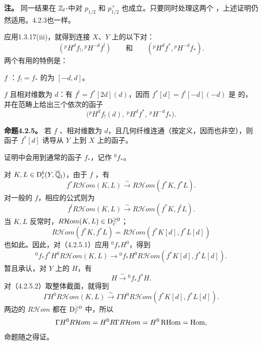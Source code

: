 \noindent\textbf{注。} 同一结果在 $\mathbb Z_l$-中对  $p_{1/2}$ 和 $p_{1/2}^{+}$ 也成立。只要同时处理这两个 ，上述证明仍然适用。4.2.3也一样。

应用1.3.17(iii)，就得到连接 $X$、$Y$ 上的以下对：
\[({}^pH^df_!,{}^pH^{-d}f^!)\qquad\text{和}\qquad({}^pH^df^*,{}^pH^{-d}f_*).\]
两个有用的特例是：

$f$ ：$f_!=f_*$ 的为 $[-d,d]$。

$f$ 且相对维数为 $d$：有 $f^!=f^*[2d](d)$，因而
$f^*[d]=f^![-d](-d)$ 是 的，并在范畴上给出三个依次的函子
\[\bigl({}^pH^df_!(d),\ {}^pH^df^*,\ {}^pH^{-d}f_*\bigr).\]

\par\medskip\noindent\textbf{命题4.2.5。} 若 $f$ 、相对维数为 $d$，且几何纤维连通（按定义，因而也非空），则 函子 $f^*[d]$ 诱导从 $Y$ 上到 $X$ 上的函子。

证明中会用到通常的函子 $f_*$，记作 ${}^0f_*$。

对 $K,L\in\mathrm{D}_c^b(Y,\overline{\mathbb Q}_l)$，由于 $f$ ，有
\begin{equation*}f^*R\mathcal Hom(K,L)\xrightarrow\sim R\mathcal Hom(f^*K,f^*L).\tag{4.2.5.1}\end{equation*}
对一般的 $f$，相应的公式则为
\[f^!R\mathcal Hom(K,L)\xrightarrow\sim R\mathcal Hom(f^*K,f^!L).\]
当 $K,L$ 反常时，$R\mathcal Hom(K,L)\in\mathrm{D}_c^{\ge0}$；\[R\mathcal Hom(f^*K,f^*L)=R\mathcal Hom(f^*K[d],f^*L[d])\] 也如此。因此，对（4.2.5.1）应用 ${}^0f_*H^0$，得到
\begin{equation*}{}^0f_*f^*H^0R\mathcal Hom(K,L)\longrightarrow{}^0f_*H^0R\mathcal Hom(f^*K[d],f^*L[d]).\tag{4.2.5.2}\end{equation*}
暂且承认，对 $Y$ 上的 $H$，有
\begin{equation*}H\xrightarrow\sim{}^0f_*f^*H.\tag{4.2.5.3}\end{equation*}
对（4.2.5.2）取整体截面，就得到
\[\Gamma H^0R\mathcal Hom(K,L)\xrightarrow\sim\Gamma H^0R\mathcal Hom(f^*K[d],f^*L[d]).\]
两边的 $R\mathcal Hom$ 都在 $\mathrm{D}_c^{\ge0}$ 中，所以
\[\Gamma H^0R\mathcal Hom=H^0R\Gamma R\mathcal Hom=H^0\operatorname{RHom}=\operatorname{Hom},\]
命题随之得证。

